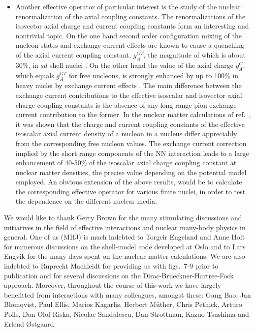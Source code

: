 \begin{itemize}
\item
Another effective operator
of particular interest
is the study of the nuclear renormalization of the axial coupling constants.
The renormalizations of the isovector axial
charge and current coupling constants form an interesting and nontrivial
topic. On the one
hand second order configuration mixing of the nucleon states and
exchange current effects are known to cause a quenching of the axial
current coupling constant, $g_A^{GT}$, the magnitude of which is about
30\%, in $sd$ shell nuclei \cite{del81}. On the other hand the value of the
axial charge $g_A^C$, which equals $g_A^{GT}$ for free nucleons, is
strongly enhanced by up to 100\% in heavy nuclei \cite{warb91a,warb91b}
by exchange current
effects \cite{town92,krt92}. The main difference between the
exchange current
contributions to the effective isoscalar and isovector axial charge
coupling
constants is the absence of any long range pion exchange current
contribution to the former.
In the nuclear matter calculations of ref.\
\cite{mkrt92},  it was shown that the charge and current
coupling constants of the
effective isoscalar axial current density of a nucleon in a nucleus differ
appreciably from the corresponding free nucleon values.
The exchange current
correction implied by the short range components of the NN
interaction leads to a large enhancement of 40-50\% of the
isoscalar axial charge coupling constant at nuclear matter densities,
the precise value depending on the
potential model employed. An obvious extension of the above results,
would be to
calculate the corresponding effective operator for various finite nuclei,
in order to test the dependence on the different nuclear media.





\end{itemize}





We would like to thank Gerry Brown for the many stimulating 
discussions and initiatives in the field of effective interactions
and nuclear many-body physics in general.
One of us (MHJ) is much indebted to Torgeir Engeland
and Anne Holt for numerous discussions on the shell-model
code developed at Oslo and to Lars Engvik for the many days
spent on the nuclear matter calculations. We are also 
indebted to Ruprecht Machleidt for providing us with
figs.\ 7-9 prior to publication and for several discussions
on the Dirac-Brueckner-Hartree-Fock approach.
Moreover, throughout the course of this work we have largely
benefitted from interactions with many colleagues, amongst these:
Gang Bao, Jan Blomqvist, Paul Ellis, Marios Kagarlis,
Herbert M\"{u}ther, Chris Pethick, Arturo Polls,
Dan Olof Riska,  Nicolae Sandulescu, Dan Strottman, Kazuo Tsushima
and Erlend \O stgaard.


